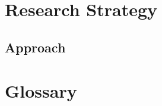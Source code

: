 \documentclass{grantplate}
\begin{document}


\cleardoublepage

\section{Research Strategy}



\subsection{Approach}






\clearpage
\section*{Glossary}
\printglossaries


\clearpage

\printbibliography[heading=bibintoc] %
\end{document}
